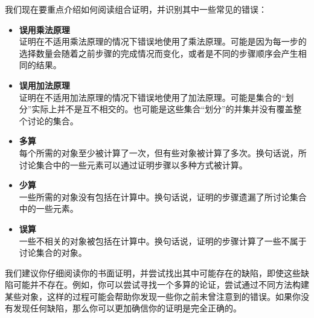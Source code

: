 我们现在要重点介绍如何阅读组合证明，并识别其中一些常见的错误：
\begin{itemize}
    \item \textbf{误用乘法原理}\\
          证明在不适用乘法原理的情况下错误地使用了乘法原理。可能是因为每一步的选择数量会随着之前步骤的完成情况而变化，或者是不同的步骤顺序会产生相同的结果。
    \item \textbf{误用加法原理}\\
          证明在不适用加法原理的情况下错误地使用了加法原理。可能是集合的``划分''实际上并不是互不相交的。也可能是这些集合``划分''的并集并没有覆盖整个讨论的集合。
    \item \textbf{多算}\\
          每个所需的对象至少被计算了一次，但有些对象被计算了多次。换句话说，所讨论集合中的一些元素可以通过证明步骤以多种方式被计算。
    \item \textbf{少算}\\
          一些所需的对象没有包括在计算中。换句话说，证明的步骤遗漏了所讨论集合中的一些元素。
    \item \textbf{误算}\\
          一些不相关的对象被包括在计算中。换句话说，证明的步骤计算了一些不属于讨论集合的对象。
\end{itemize}
我们建议你仔细阅读你的书面证明，并尝试找出其中可能存在的缺陷，即使这些缺陷可能并不存在。例如，你可以尝试寻找一个多算的论证，尝试通过不同方法构建某些对象，这样的过程可能会帮助你发现一些你之前未曾注意到的错误。如果你没有发现任何缺陷，那么你可以更加确信你的证明是完全正确的。\\

